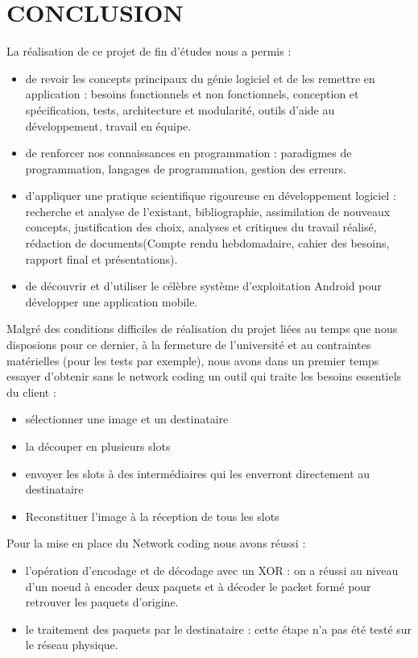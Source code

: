 \chapter{ CONCLUSION}
{La réalisation de ce projet  de fin d'études nous a permis :
\begin{itemize}
    \item de revoir les concepts principaux du génie logiciel et de les remettre en application : besoins fonctionnels et non fonctionnels, conception et spécification, tests, architecture et modularité, outils d'aide au développement, travail en équipe.
    \item de renforcer nos connaissances en programmation : paradigmes de programmation, langages de programmation, gestion des erreurs.
    \item d'appliquer une pratique scientifique rigoureuse en développement logiciel : recherche et analyse de l'existant, bibliographie, assimilation de nouveaux concepts, justification des choix, analyses et critiques du travail réalisé, rédaction de documents(Compte rendu hebdomadaire, cahier des besoins, rapport final et présentations).
    \item de découvrir et d'utiliser le célèbre système d'exploitation Android pour développer une application mobile.
    \end{itemize}{}\par}
{Malgré des conditions difficiles de réalisation du projet liées au temps que nous disposions pour ce dernier, à la fermeture de l'université et au contraintes matérielles (pour les tests par exemple), nous avons dans un premier temps essayer d'obtenir sans le network coding un outil qui traite les besoins essentiels du client :
    \begin{itemize}
        \item sélectionner une image et un destinataire 
        \item la découper en plusieurs slots 
        \item envoyer les slots à des intermédiaires qui les enverront directement au destinataire
        \item  Reconstituer l'image à la réception de tous les slots
    \end{itemize}{}\par}

Pour la mise en place du Network coding nous avons réussi : 
 \begin{itemize}
        \item l'opération d'encodage et de décodage avec un XOR : on a réussi au niveau d'un noeud à encoder deux paquets et à décoder le packet formé pour retrouver les paquets d'origine. 
        \item le traitement des paquets par le destinataire : cette étape n'a pas été testé sur le réseau physique. 
    \end{itemize}

